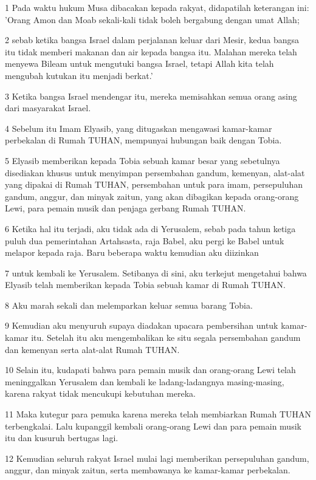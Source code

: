\par 1 Pada waktu hukum Musa dibacakan kepada rakyat, didapatilah keterangan ini: 'Orang Amon dan Moab sekali-kali tidak boleh bergabung dengan umat Allah;
\par 2 sebab ketika bangsa Israel dalam perjalanan keluar dari Mesir, kedua bangsa itu tidak memberi makanan dan air kepada bangsa itu. Malahan mereka telah menyewa Bileam untuk mengutuki bangsa Israel, tetapi Allah kita telah mengubah kutukan itu menjadi berkat.'
\par 3 Ketika bangsa Israel mendengar itu, mereka memisahkan semua orang asing dari masyarakat Israel.
\par 4 Sebelum itu Imam Elyasib, yang ditugaskan mengawasi kamar-kamar perbekalan di Rumah TUHAN, mempunyai hubungan baik dengan Tobia.
\par 5 Elyasib memberikan kepada Tobia sebuah kamar besar yang sebetulnya disediakan khusus untuk menyimpan persembahan gandum, kemenyan, alat-alat yang dipakai di Rumah TUHAN, persembahan untuk para imam, persepuluhan gandum, anggur, dan minyak zaitun, yang akan dibagikan kepada orang-orang Lewi, para pemain musik dan penjaga gerbang Rumah TUHAN.
\par 6 Ketika hal itu terjadi, aku tidak ada di Yerusalem, sebab pada tahun ketiga puluh dua pemerintahan Artahsasta, raja Babel, aku pergi ke Babel untuk melapor kepada raja. Baru beberapa waktu kemudian aku diizinkan
\par 7 untuk kembali ke Yerusalem. Setibanya di sini, aku terkejut mengetahui bahwa Elyasib telah memberikan kepada Tobia sebuah kamar di Rumah TUHAN.
\par 8 Aku marah sekali dan melemparkan keluar semua barang Tobia.
\par 9 Kemudian aku menyuruh supaya diadakan upacara pembersihan untuk kamar-kamar itu. Setelah itu aku mengembalikan ke situ segala persembahan gandum dan kemenyan serta alat-alat Rumah TUHAN.
\par 10 Selain itu, kudapati bahwa para pemain musik dan orang-orang Lewi telah meninggalkan Yerusalem dan kembali ke ladang-ladangnya masing-masing, karena rakyat tidak mencukupi kebutuhan mereka.
\par 11 Maka kutegur para pemuka karena mereka telah membiarkan Rumah TUHAN terbengkalai. Lalu kupanggil kembali orang-orang Lewi dan para pemain musik itu dan kusuruh bertugas lagi.
\par 12 Kemudian seluruh rakyat Israel mulai lagi memberikan persepuluhan gandum, anggur, dan minyak zaitun, serta membawanya ke kamar-kamar perbekalan.

